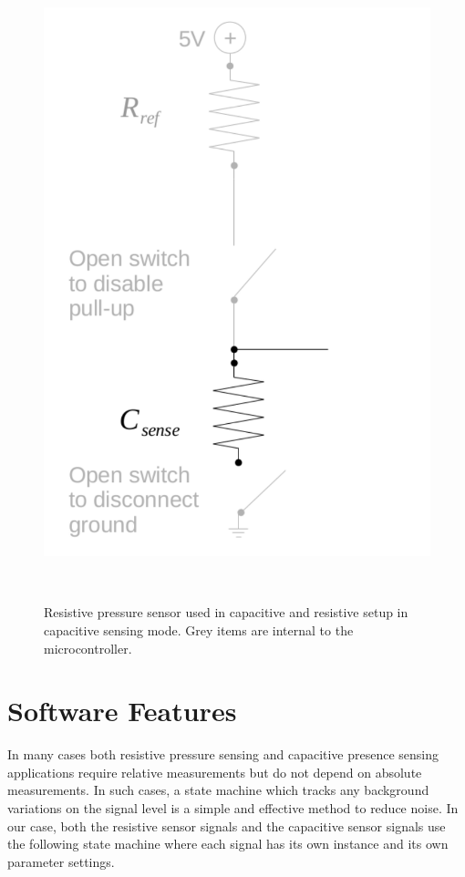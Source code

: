 \documentclass{sigchi-ext}
\begin{document}
\begin{figure}[!htbp]
\centering
  \includegraphics[width=0.9\columnwidth]{figures/cap_res_setup_cap}
  \caption{Resistive pressure sensor used in capacitive and resistive setup in
capacitive sensing mode. Grey items are internal to the
microcontroller.}~\label{fig:cap_res_setup_cap}
\end{figure}

\section{Software Features}
In many cases both resistive pressure sensing and capacitive presence sensing
applications require relative measurements but do not depend on absolute
measurements. In such cases, a state machine which tracks any background
variations on the signal level is a simple and effective method to reduce noise.
In our case, both the resistive sensor signals and the capacitive sensor signals
use the following state machine where each signal has its own instance and
its own parameter settings.
\end{document}
